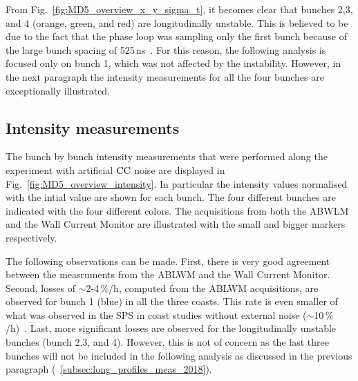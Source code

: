
From Fig.~\ref{fig:MD5_overview_x_y_sigma_t}, it becomes clear that bunches 2,3, and 4 (orange, green, and red) are longitudinally unstable. This is believed to be due to the
fact that the phase loop was sampling only the first bunch
because of the large bunch spacing of 525\,ns~\cite{Argyropoulos_unstable_bunches_2018}. For this
reason, the following analysis is focused only on bunch 1,
which was not affected by the instability. However, in the next paragraph the intensity measurements for all the four bunches are exceptionally illustrated.

\subsection{Intensity measurements}\label{subsec:intensity_2018_meas}
The bunch by bunch intensity measurements that were performed along the experiment with artificial ${\mathrm{CC}}$ noise are displayed in Fig.~\ref{fig:MD5_overview_intensity}. In particular the intensity values normalised with the intial value are shown for each bunch. The four different bunches are indicated with the four different colors. The acquisitions from both the ABWLM and the Wall Current Monitor are illustrated with the small and bigger markers respectively.

The following observations can be made. First, there is very good agreement between the measruments from the ABLWM and the Wall Current Monitor. Second, losses of $\sim$2-4\,$\%$/h, computed from the ABLWM acquisitions, are observed for bunch 1 (blue) in all the three coasts. This rate is even smaller of what was observed in the SPS in coast studies without external noise ($\sim$10\,$\%$/h)~\cite{Alekou_CC_coast_prep_2016}. Last, more significant losses are observed for the longitudinally unstable bunches (bunch 2,3, and 4). However, this is not of concern as the last three bunches will not be included in the following analysis as discussed in the previous paragraph (~\ref{subsec:long_profiles_meas_2018}).

